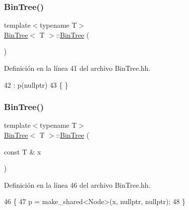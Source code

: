 \subsubsection{\texorpdfstring{Bin\+Tree()}{BinTree()}\hspace{0.1cm}{\footnotesize\ttfamily [1/3]}}
{\footnotesize\ttfamily template$<$typename T$>$ \\
\hyperlink{class_bin_tree}{Bin\+Tree}$<$ T $>$\+::\hyperlink{class_bin_tree}{Bin\+Tree} (\begin{DoxyParamCaption}{ }\end{DoxyParamCaption})}



Definición en la línea 41 del archivo Bin\+Tree.\+hh.


\begin{DoxyCode}
42     :   p(\textcolor{keyword}{nullptr})
43     \{   \}
\end{DoxyCode}
\mbox{\label{class_bin_tree_a1ab686e0bcf990093ff91fe71744c1a4}} 
\subsubsection{\texorpdfstring{Bin\+Tree()}{BinTree()}\hspace{0.1cm}{\footnotesize\ttfamily [2/3]}}
{\footnotesize\ttfamily template$<$typename T$>$ \\
\hyperlink{class_bin_tree}{Bin\+Tree}$<$ T $>$\+::\hyperlink{class_bin_tree}{Bin\+Tree} (\begin{DoxyParamCaption}\item[{const T \&}]{x }\end{DoxyParamCaption})}



Definición en la línea 46 del archivo Bin\+Tree.\+hh.


\begin{DoxyCode}
46                          \{
47         p = make\_shared<Node>(x, \textcolor{keyword}{nullptr}, \textcolor{keyword}{nullptr});
48     \}
\end{DoxyCode}
\mbox{\label{class_bin_tree_adb7eeff76d08130c943b36af215eb521}} 
